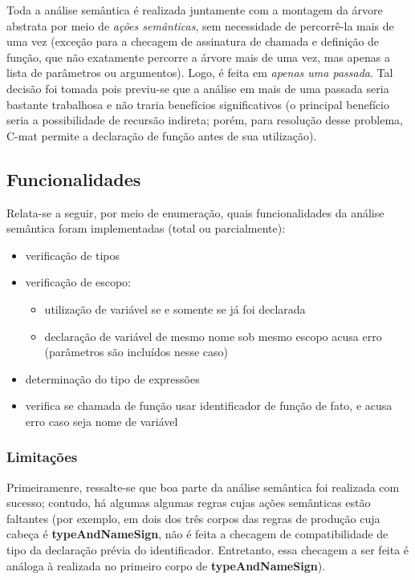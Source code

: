 \documentclass[
	article,			%
	11pt,				%
	oneside,			%
	a4paper,			%
	english,			%
	brazil,				%
	sumario=tradicional
	]{abntex2}
\renewcommand{\it}[1]{\textit{#1}}
\renewcommand{\bf}[1]{\textbf{#1}}
\begin{document}
Toda a análise semântica é realizada juntamente com a montagem da árvore abstrata por meio de \it{ações semânticas}, sem necessidade de percorrê-la mais de uma vez (exceção para a checagem de assinatura de chamada e definição de função, que não exatamente percorre a árvore mais de uma vez, mas apenas a lista de parâmetros ou argumentos). Logo, é feita em \it{apenas uma passada}. Tal decisão foi tomada pois previu-se que a análise em mais de uma passada seria bastante trabalhosa e não traria benefícios significativos (o principal
benefício seria a possibilidade de recursão indireta; porém, para resolução desse problema, C-mat permite a declaração de função antes de sua utilização).

\subsection{Funcionalidades}
Relata-se a seguir, por meio de enumeração, quais funcionalidades da análise semântica foram implementadas (total ou parcialmente):
\begin{itemize}
	\item verificação de tipos
	\item verificação de escopo:
		\begin{itemize}
			\item utilização de variável se e somente se já foi declarada
			\item declaração de variável de mesmo nome sob mesmo escopo acusa erro (parâmetros são incluídos nesse caso)
		\end{itemize}
	\item determinação do tipo de expressões
	\item verifica se chamada de função usar identificador de função de fato, e acusa erro caso seja nome de variável
\end{itemize}


\subsubsection{Limitações}

Primeiramenre, ressalte-se que boa parte da análise semântica foi realizada com sucesso; contudo, há algumas algumas regras cujas ações semânticas estão faltantes (por exemplo, em dois dos três corpos das regras de produção cuja cabeça é \bf{typeAndNameSign}, não é feita a checagem de compatibilidade de tipo da declaração prévia do identificador. Entretanto, essa checagem a ser feita é análoga à realizada no primeiro corpo de \bf{typeAndNameSign}).
\end{document}
